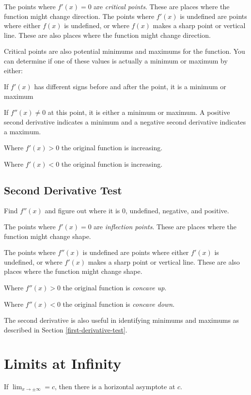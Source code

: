 \documentclass[fleqn]{exam}
\begin{document}
The points where $f'(x) = 0$ are {\em critical points}.  These are places where the function might change direction.
The points where $f'(x)$ is undefined are points where either $f(x)$ is undefined, or where $f(x)$ makes a sharp point
or vertical line.  These are also places where the function might change direction.

Critical points are also potential minimums and maximums for the function.  You can determine if one of these values is
actually a minimum or maximum by either:

\begin{itemize*}
  \item If $f'(x)$ has different signs before and after the point, it is a minimum or maximum
  \item If $f''(x) \neq 0$ at this point, it is either a minimum or maximum.  A positive second derivative indicates a
    minimum and a negative second derivative indicates a maximum.
\end{itemize*}

Where $f'(x) > 0$ the original function is increasing.

Where $f'(x) < 0$ the original function is increasing.

\subsection{Second Derivative Test}

Find $f''(x)$ and figure out where it is 0, undefined, negative, and positive.  

The points where $f'(x) = 0$ are {\em inflection points}.  These are places where the function might change shape.

The points where $f''(x)$ is undefined are points where either $f'(x)$ is undefined, or where $f'(x)$ makes a sharp point
or vertical line.  These are also places where the function might change shape.

Where $f''(x) > 0$ the original function is {\em concave up}.

Where $f''(x) < 0$ the original function is {\em concave down}.

The second derivative is also useful in identifying minimums and maximums as described in Section \ref{first-derivative-test}.

\section{Limits at Infinity}
If $\lim_{x \to \pm \infty} = c$, then there is a horizontal asymptote at $c$.
\end{document}
